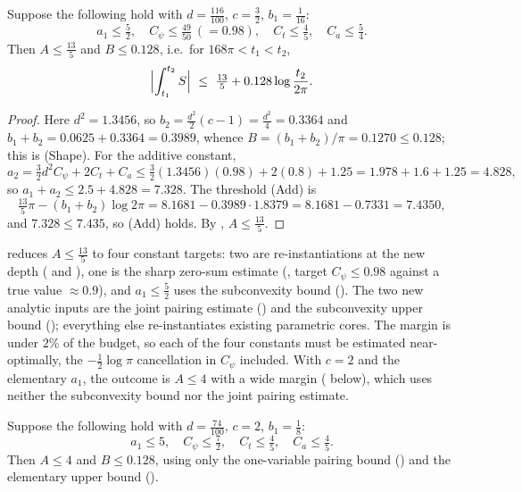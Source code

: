 \begin{theorem}
\label{thm:ls_conditional}
Suppose the following hold with $d=\tfrac{116}{100}$, $c=\tfrac32$, $b_1=\tfrac1{16}$:
\[
  a_1\le\tfrac52,\quad
  C_\psi\le\tfrac{49}{50}\ (=0.98),\quad
  C_t\le\tfrac{4}{5},\quad
  C_a\le\tfrac54 .
\]
Then $A\le\tfrac{13}5$ and $B\le0.128$, i.e.\ for $168\pi<t_1<t_2$,
\[
  \Bigl|\int_{t_1}^{t_2}S\Bigr|\ \le\ \tfrac{13}5+0.128\log\frac{t_2}{2\pi}.
\]
\end{theorem}

\begin{proof}
Here $d^2=1.3456$, so $b_2=\tfrac{d^2}2(c-1)=\tfrac{d^2}4=0.3364$ and
$b_1+b_2=0.0625+0.3364=0.3989$, whence $B=(b_1+b_2)/\pi=0.1270\le0.128$; this is
\textup{(Shape)}. For the additive constant,
\[
  a_2=\tfrac32 d^2C_\psi+2C_t+C_a
     \le\tfrac32(1.3456)(0.98)+2(0.8)+1.25
     =1.978+1.6+1.25=4.828,
\]
so $a_1+a_2\le2.5+4.828=7.328$. The threshold \textup{(Add)} is
\[
  \tfrac{13}5\pi-(b_1+b_2)\log2\pi=8.1681-0.3989\cdot1.8379=8.1681-0.7331=7.4350,
\]
and $7.328\le7.435$, so \textup{(Add)} holds. By ,
$A\le\tfrac{13}5$.
\end{proof}

\begin{remark}
\label{rem:ls_scope}
 reduces $A\le\tfrac{13}5$ to four constant targets: two are
re-instantiations at the new depth ( and ), one is the
sharp zero-sum estimate (, target $C_\psi\le0.98$ against a true value
$\approx0.9$), and $a_1\le\tfrac52$ uses the subconvexity bound
(). The two new analytic inputs are the joint pairing
estimate () and the subconvexity upper bound
(); everything else re-instantiates existing parametric
cores. The margin is under $2\%$ of the budget, so each of the four constants must be
estimated near-optimally, the $-\tfrac12\log\pi$ cancellation in $C_\psi$ included.
With $c=2$ and the elementary $a_1$, the outcome is $A\le4$ with a wide margin
( below), which uses neither the subconvexity bound nor
the joint pairing estimate.
\end{remark}

\begin{theorem}
\label{thm:ls_conditional_weak}
Suppose the following hold with $d=\tfrac{74}{100}$, $c=2$, $b_1=\tfrac18$:
\[
  a_1\le 5,\quad
  C_\psi\le\tfrac72,\quad
  C_t\le\tfrac45,\quad
  C_a\le\tfrac45 .
\]
Then $A\le4$ and $B\le0.128$, using only the one-variable pairing bound
() and the elementary upper bound ().
\end{theorem}

